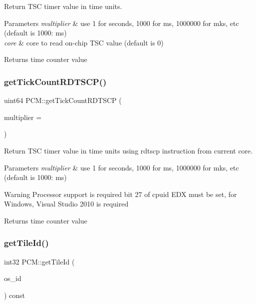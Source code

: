 Return T\+SC timer value in time units. 


\begin{DoxyParams}{Parameters}
{\em multiplier} & use 1 for seconds, 1000 for ms, 1000000 for mks, etc (default is 1000\+: ms) \\
\hline
{\em core} & core to read on-\/chip T\+SC value (default is 0) \\
\hline
\end{DoxyParams}
\begin{DoxyReturn}{Returns}
time counter value 
\end{DoxyReturn}
\mbox{\label{class_p_c_m_a0d5153c7ec05003da7d20aeea737113e}} 
\subsubsection{\texorpdfstring{get\+Tick\+Count\+R\+D\+T\+S\+C\+P()}{getTickCountRDTSCP()}}
{\footnotesize\ttfamily uint64 P\+C\+M\+::get\+Tick\+Count\+R\+D\+T\+S\+CP (\begin{DoxyParamCaption}\item[{uint64}]{multiplier = {} }\end{DoxyParamCaption})}



Return T\+SC timer value in time units using rdtscp instruction from current core. 


\begin{DoxyParams}{Parameters}
{\em multiplier} & use 1 for seconds, 1000 for ms, 1000000 for mks, etc (default is 1000\+: ms) \\
\hline
\end{DoxyParams}
\begin{DoxyWarning}{Warning}
Processor support is required bit 27 of cpuid E\+DX must be set, for Windows, Visual Studio 2010 is required 
\end{DoxyWarning}
\begin{DoxyReturn}{Returns}
time counter value 
\end{DoxyReturn}
\mbox{\label{class_p_c_m_a2b4433865e00da98c4fa588cb1be913c}} 
\subsubsection{\texorpdfstring{get\+Tile\+Id()}{getTileId()}}
{\footnotesize\ttfamily int32 P\+C\+M\+::get\+Tile\+Id (\begin{DoxyParamCaption}\item[{uint32}]{os\+\_\+id }\end{DoxyParamCaption}) const\hspace{0.3cm}{\ttfamily [inline]}}



